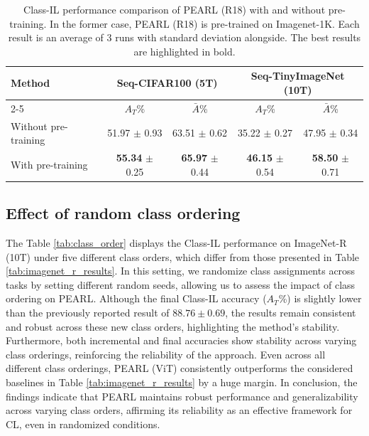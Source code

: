 \documentclass[10pt]{article} %
\begin{document}
\begin{table}[h]
    \centering

    \caption{Class-IL performance comparison of PEARL (R18) with and without pre-training. In the former case, PEARL (R18) is pre-trained on Imagenet-1K. Each result is an average of 3 runs with standard deviation alongside. The best results are highlighted in bold. }
    \begin{tabular}{l|c|c|c|c}
        \toprule
        \textbf{Method} & \multicolumn{2}{|c|}{Seq-CIFAR100 (5T)} & \multicolumn{2}{|c}{Seq-TinyImageNet (10T)}  \\
        \cmidrule(r){2-5}
         & $A_T$\% & $\bar{A}$\% &  $A_T$\% & $\bar{A}$\% \\
        \midrule
        Without pre-training &  51.97	$\pm$ 0.93   &  63.51 $\pm$ 0.62 & 35.22 $\pm$ 0.27  & 47.95 $\pm$ 0.34 \\
        With pre-training & \textbf{55.34} $\pm$ 0.25  & \textbf{65.97} $\pm$ 0.44 & \textbf{46.15} $\pm$ 0.54   & \textbf{58.50} $\pm$ 0.71 \\

        \bottomrule
    \end{tabular}
    \label{tab:pre-training}

\end{table}




\subsection{Effect of random class ordering}

The Table \ref{tab:class_order} displays the Class-IL performance on ImageNet-R (10T) under five different class orders, which differ from those presented in Table \ref{tab:imagenet_r_results}. In this setting, we randomize class assignments across tasks by setting different random seeds, allowing us to assess the impact of class ordering on PEARL. Although the final Class-IL accuracy ($A_T$\%) is slightly lower than the previously reported result of $88.76 \pm 0.69$, the results remain consistent and robust across these new class orders, highlighting the method's stability. Furthermore, both incremental and final accuracies show stability across varying class orderings, reinforcing the reliability of the approach. Even across all different class orderings, PEARL (ViT) consistently outperforms the considered baselines in Table \ref{tab:imagenet_r_results} by a huge margin. In conclusion, the findings indicate that PEARL maintains robust performance and generalizability across varying class orders, affirming its reliability as an effective framework for CL, even in randomized conditions.
\end{document}
